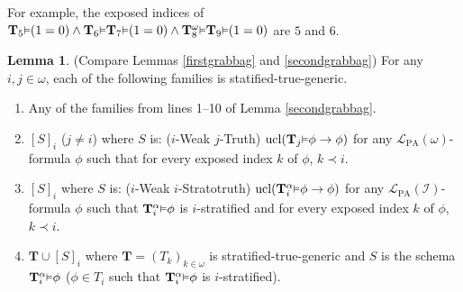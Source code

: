 \documentclass[reqno]{article}
\theoremstyle{definition}
\newtheorem{lemma}[theorem]{Lemma}
\def\L{\mathscr{L}}
\def\T{\mathbf{T}}
\def\LPA{\L_{\mathrm{PA}}}
\def\indset{\mathcal I}
\renewcommand{\Pr}[1]{\T_{#1}\mbox{\small${\vDash}$}}
\newcommand{\Prr}[2]{\T^{#1}_{#2}\mbox{\small${\vDash}$}}
\newcommand{\ucl}[1]{\mathrm{ucl}(#1)}
\begin{document}
For example, the exposed indices of
$\Pr 5(1=0) \wedge \Pr 6\Pr 7(1=0)\wedge \Prr\omega 8\Pr 9(1=0)$
are $5$ and $6$.

\begin{lemma}
\label{thirdgrabbag}
(Compare Lemmas \ref{firstgrabbag} and \ref{secondgrabbag})
For any $i,j\in\omega$, each of the following families is statified-true-generic.
\begin{enumerate}
\item Any of the families from lines 1--10 of Lemma \ref{secondgrabbag}.
\item $[S]_i$ ($j\not=i$) where $S$ is: ($i$-Weak $j$-Truth) $\ucl{\Pr j\phi\rightarrow\phi}$ for any $\LPA(\omega)$-formula $\phi$
such that for every exposed index $k$ of $\phi$, $k\prec i$.
\item $[S]_i$ where $S$ is: ($i$-Weak $i$-Stratotruth) $\ucl{\Prr\alpha i\phi\rightarrow\phi}$ for any $\LPA(\indset)$-formula $\phi$ such that 
$\Prr\alpha i\phi$ is $i$-stratified and for every exposed index $k$ of $\phi$, $k\prec i$.
%
%
%
\item $\T\cup [S]_i$ where $\T=(T_k)_{k\in\omega}$ is stratified-true-generic and $S$ is the schema $\Prr\alpha i\phi$ ($\phi\in T_i$ such that 
$\Prr\alpha i \phi$ is $i$-stratified).
\end{enumerate}
\end{lemma}
\end{document}
